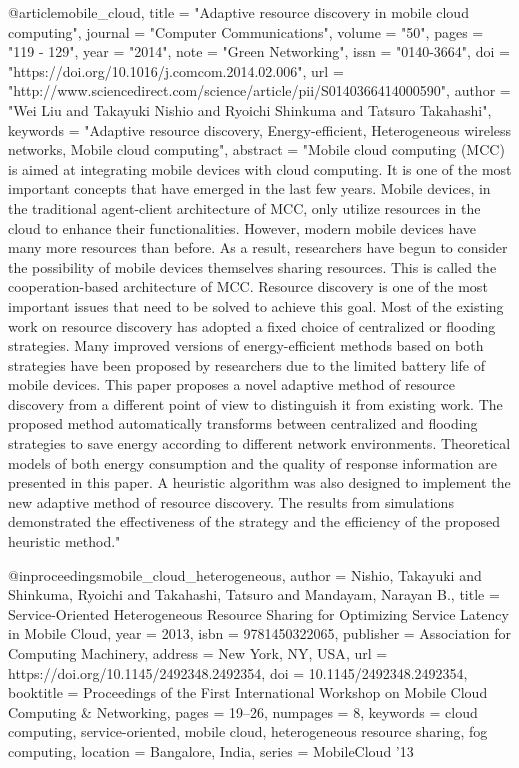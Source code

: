 @article{mobile_cloud,
    title = "Adaptive resource discovery in mobile cloud computing",
    journal = "Computer Communications",
    volume = "50",
    pages = "119 - 129",
    year = "2014",
    note = "Green Networking",
    issn = "0140-3664",
    doi = "https://doi.org/10.1016/j.comcom.2014.02.006",
    url = "http://www.sciencedirect.com/science/article/pii/S0140366414000590",
    author = "Wei Liu and Takayuki Nishio and Ryoichi Shinkuma and Tatsuro Takahashi",
    keywords = "Adaptive resource discovery, Energy-efficient, Heterogeneous wireless networks, Mobile cloud computing",
    abstract = "Mobile cloud computing (MCC) is aimed at integrating mobile devices with cloud computing. It is one of the most important concepts that have emerged in the last few years. Mobile devices, in the traditional agent-client architecture of MCC, only utilize resources in the cloud to enhance their functionalities. However, modern mobile devices have many more resources than before. As a result, researchers have begun to consider the possibility of mobile devices themselves sharing resources. This is called the cooperation-based architecture of MCC. Resource discovery is one of the most important issues that need to be solved to achieve this goal. Most of the existing work on resource discovery has adopted a fixed choice of centralized or flooding strategies. Many improved versions of energy-efficient methods based on both strategies have been proposed by researchers due to the limited battery life of mobile devices. This paper proposes a novel adaptive method of resource discovery from a different point of view to distinguish it from existing work. The proposed method automatically transforms between centralized and flooding strategies to save energy according to different network environments. Theoretical models of both energy consumption and the quality of response information are presented in this paper. A heuristic algorithm was also designed to implement the new adaptive method of resource discovery. The results from simulations demonstrated the effectiveness of the strategy and the efficiency of the proposed heuristic method."
}

@inproceedings{mobile_cloud_heterogeneous,
    author = {Nishio, Takayuki and Shinkuma, Ryoichi and Takahashi, Tatsuro and Mandayam, Narayan B.},
    title = {Service-Oriented Heterogeneous Resource Sharing for Optimizing Service Latency in Mobile Cloud},
    year = {2013},
    isbn = {9781450322065},
    publisher = {Association for Computing Machinery},
    address = {New York, NY, USA},
    url = {https://doi.org/10.1145/2492348.2492354},
    doi = {10.1145/2492348.2492354},
    booktitle = {Proceedings of the First International Workshop on Mobile Cloud Computing & Networking},
    pages = {19–26},
    numpages = {8},
    keywords = {cloud computing, service-oriented, mobile cloud, heterogeneous resource sharing, fog computing},
    location = {Bangalore, India},
    series = {MobileCloud ’13}
}

